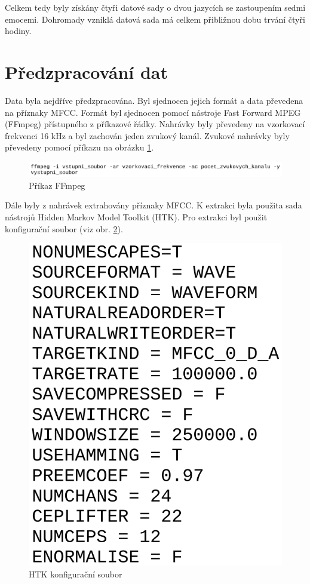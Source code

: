 \documentclass[FM,BP]{tulthesis}
\newcommand{\note}[1]{\todo[color=blue!40]{#1}}
\begin{document}
Celkem tedy byly získány čtyři datové sady o dvou jazycích se zastoupením sedmi emocemi. Dohromady vzniklá datová sada má celkem přibližnou dobu trvání čtyři hodiny.

\section{Předzpracování dat} %
Data byla nejdříve předzpracována. Byl sjednocen jejich formát a data převedena na příznaky MFCC. Formát byl sjednocen pomocí nástroje Fast Forward MPEG (FFmpeg) přístupného z příkazové řádky. Nahrávky byly převedeny na vzorkovací frekvenci 16 kHz a byl zachován jeden zvukový kanál. Zvukové nahrávky byly převedeny pomocí příkazu na obrázku \mbox{\ref{fig:ffmpeg}}.

\begin{figure}[htbp]
\centerline{\includegraphics[width=\textwidth,height=\textheight,keepaspectratio]{ffmpeg_command.png}}
\caption{Příkaz FFmpeg}
\label{fig:ffmpeg}
\end{figure}
\FloatBarrier

Dále byly z nahrávek extrahovány příznaky MFCC. K extrakci byla použita sada nástrojů Hidden Markov Model Toolkit (HTK). \note{odkaz?}
Pro extrakci byl použit konfigurační soubor (viz obr. \mbox{\ref{fig:htk_config})}.

\begin{figure}[htbp]
\centerline{\includegraphics[scale=.2,keepaspectratio]{htk_config.png}}
\caption{HTK konfigurační soubor}
\label{fig:htk_config}
\end{figure}
\FloatBarrier
\end{document}
